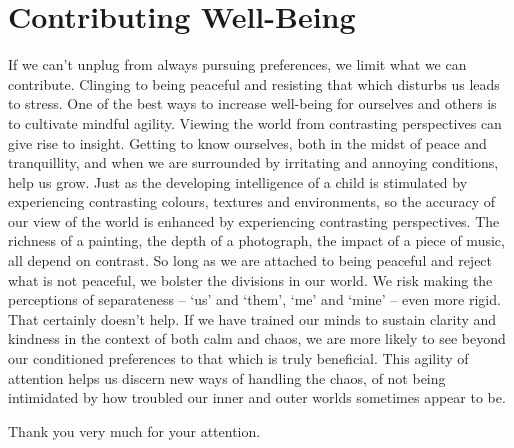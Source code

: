 \section{Contributing Well-Being}

If we can’t unplug from always pursuing preferences, we limit what we
can contribute. Clinging to being peaceful and resisting that which
disturbs us leads to stress. One of the best ways to increase well-being
for ourselves and others is to cultivate mindful agility. Viewing the
world from contrasting perspectives can give rise to insight. Getting to
know ourselves, both in the midst of peace and tranquillity, and when we
are surrounded by irritating and annoying conditions, help us grow. Just
as the developing intelligence of a child is stimulated by experiencing
contrasting colours, textures and environments, so the accuracy of our
view of the world is enhanced by experiencing contrasting perspectives.
The richness of a painting, the depth of a photograph, the impact of a
piece of music, all depend on contrast. So long as we are attached to
being peaceful and reject what is not peaceful, we bolster the divisions
in our world. We risk making the perceptions of separateness – ‘us’ and
‘them’, ‘me’ and ‘mine’ – even more rigid. That certainly doesn’t help.
If we have trained our minds to sustain clarity and kindness in the
context of both calm and chaos, we are more likely to see beyond our
conditioned preferences to that which is truly beneficial. This agility
of attention helps us discern new ways of handling the chaos, of not
being intimidated by how troubled our inner and outer worlds sometimes
appear to be.

Thank you very much for your attention.
